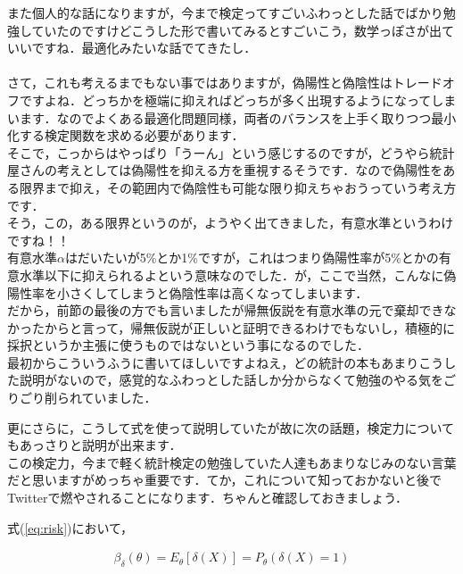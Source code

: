 \documentclass[11pt,a4paper,uplatex]{ujreport} 	%
\begin{document}
また個人的な話になりますが，今まで検定ってすごいふわっとした話でばかり勉強していたのですけどこうした形で書いてみるとすごいこう，数学っぽさが出ていいですね．最適化みたいな話でてきたし．\\\\

さて，これも考えるまでもない事ではありますが，偽陽性と偽陰性はトレードオフですよね．どっちかを極端に抑えればどっちが多く出現するようになってしまいます．なのでよくある最適化問題同様，両者のバランスを上手く取りつつ最小化する検定関数を求める必要があります．\\

そこで，こっからはやっぱり「うーん」という感じするのですが，どうやら統計屋さんの考えとしては偽陽性を抑える方を重視するそうです．なので偽陽性をある限界まで抑え，その範囲内で偽陰性も可能な限り抑えちゃおうっていう考え方です．\\

そう，この，ある限界というのが，ようやく出てきました，有意水準というわけですね！！\\

有意水準$\alpha$はだいたいが5\%とか1\%ですが，これはつまり偽陽性率が5\%とかの有意水準以下に抑えられるよという意味なのでした．が，ここで当然，こんなに偽陽性率を小さくしてしまうと偽陰性率は高くなってしまいます．\\

だから，前節の最後の方でも言いましたが帰無仮説を有意水準の元で棄却できなかったからと言って，帰無仮説が正しいと証明できるわけでもないし，積極的に採択というか主張に使うものではないという事になるのでした．\\

最初からこういうふうに書いてほしいですよねえ，どの統計の本もあまりこうした説明がないので，感覚的なふわっとした話しか分からなくて勉強のやる気をごりごり削られていました．

更にさらに，こうして式を使って説明していたが故に次の話題，検定力についてもあっさりと説明が出来ます．\\

この検定力，今まで軽く統計検定の勉強していた人達もあまりなじみのない言葉だと思いますがめっちゃ重要です．てか，これについて知っておかないと後でTwitterで燃やされることになります．ちゃんと確認しておきましょう．

式(\ref{eq:risk})において，

\begin{align}
  \beta_\delta(\theta) = E_\theta[\delta(X)] = P_\theta(\delta(X)=1)
\end{align}
\end{document}
